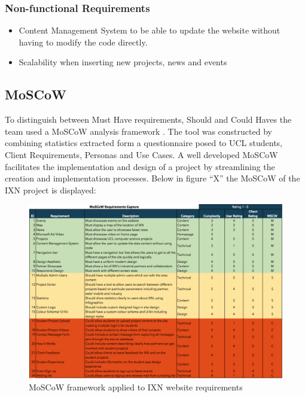 \documentclass[fontsize=10pt]{extarticle}
\numberwithin{figure}{section} %
\providecommand{\tightlist}{%
  \setlength{\itemsep}{0pt}\setlength{\parskip}{0pt}}
\begin{document}
\hypertarget{non-functional-requirements}{%
\subsubsection{Non-functional
Requirements}\label{non-functional-requirements}}

\begin{itemize}
\tightlist
\item
  Content Management System to be able to update the website without
  having to modify the code directly.
\item
  Scalability when inserting new projects, news and events
\end{itemize}

\hypertarget{moscow}{%
\subsection{MoSCoW}\label{moscow}}

To distinguish between Must Have requirements, Should and Could Haves
the team used a MoSCoW analysis framework \cite{g4}. The tool was
constructed by combining statistics extracted form a questionnaire posed
to UCL students, Client Requirements, Personas and Use Cases. A well
developed MoSCoW facilitates the implementation and design of a project
by streamlining the creation and implementation processes. Below in
figure ``X'' the MoSCoW of the IXN project is displayed:

\newpage

\begin{landscape}
\begin{figure}[H]
      \centering
      \includegraphics[trim = 0 0 0 0, clip, width=1.3\textwidth]{ph2.png}
      \caption{MoSCoW framework applied to IXN website requirements}
 \end{figure}
 \end{landscape}
\end{document}
